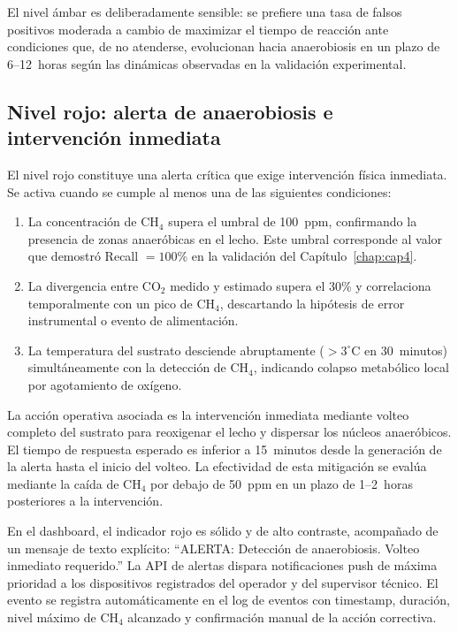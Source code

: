 El nivel ámbar es deliberadamente sensible: se prefiere una tasa de falsos positivos moderada a cambio de maximizar el tiempo de reacción ante condiciones que, de no atenderse, evolucionan hacia anaerobiosis en un plazo de 6--12~horas según las dinámicas observadas en la validación experimental.

\subsection{Nivel rojo: alerta de anaerobiosis e intervención inmediata}
\label{subsec:cap5_rojo}

El nivel rojo constituye una alerta crítica que exige intervención física inmediata. Se activa cuando se cumple al menos una de las siguientes condiciones:

\begin{enumerate}
    \item La concentración de CH$_4$ supera el umbral de 100~ppm, confirmando la presencia de zonas anaeróbicas en el lecho. Este umbral corresponde al valor que demostró Recall $= 100$\% en la validación del Capítulo~\ref{chap:cap4}.
    \item La divergencia entre CO$_2$ medido y estimado supera el 30\% y correlaciona temporalmente con un pico de CH$_4$, descartando la hipótesis de error instrumental o evento de alimentación.
    \item La temperatura del sustrato desciende abruptamente ($> 3^\circ$C en 30~minutos) simultáneamente con la detección de CH$_4$, indicando colapso metabólico local por agotamiento de oxígeno.
\end{enumerate}

La acción operativa asociada es la intervención inmediata mediante volteo completo del sustrato para reoxigenar el lecho y dispersar los núcleos anaeróbicos. El tiempo de respuesta esperado es inferior a 15~minutos desde la generación de la alerta hasta el inicio del volteo. La efectividad de esta mitigación se evalúa mediante la caída de CH$_4$ por debajo de 50~ppm en un plazo de 1--2~horas posteriores a la intervención.

En el dashboard, el indicador rojo es sólido y de alto contraste, acompañado de un mensaje de texto explícito: ``ALERTA: Detección de anaerobiosis. Volteo inmediato requerido.'' La API de alertas dispara notificaciones push de máxima prioridad a los dispositivos registrados del operador y del supervisor técnico. El evento se registra automáticamente en el log de eventos con timestamp, duración, nivel máximo de CH$_4$ alcanzado y confirmación manual de la acción correctiva.

